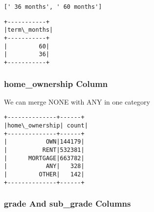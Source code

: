 \documentclass[11pt]{article}
\makeatletter
\newcommand{\boxspacing}{\kern\kvtcb@left@rule\kern\kvtcb@boxsep}
\newcommand{\prompt}[4]{
        {\ttfamily\llap{{\color{#2}[#3]:\hspace{3pt}#4}}\vspace{-\baselineskip}}
    }
\makeatother
\begin{document}
            \begin{tcolorbox}[breakable, size=fbox, boxrule=.5pt, pad at break*=1mm, opacityfill=0]
\prompt{Out}{outcolor}{44}{\boxspacing}
\begin{Verbatim}[commandchars=\\\{\}]
[' 36 months', ' 60 months']
\end{Verbatim}
\end{tcolorbox}
        
    \begin{Verbatim}[commandchars=\\\{\}]
+-----------+
|term\_months|
+-----------+
|         60|
|         36|
+-----------+

    \end{Verbatim}

    \hypertarget{home_ownership-column}{%
\subsubsection{home\_ownership Column}\label{home_ownership-column}}

    We can merge NONE with ANY in one category

    \begin{Verbatim}[commandchars=\\\{\}]
+--------------+------+
|home\_ownership| count|
+--------------+------+
|           OWN|144179|
|          RENT|532381|
|      MORTGAGE|663782|
|           ANY|   328|
|         OTHER|   142|
+--------------+------+

    \end{Verbatim}

    \hypertarget{grade-and-sub_grade-columns}{%
\subsubsection{grade And sub\_grade
Columns}\label{grade-and-sub_grade-columns}}

    \begin{center}
    \end{center}
    { \hspace*{\fill} \\}
    
    \begin{center}
    \end{center}
    { \hspace*{\fill} \\}
    
\end{document}
